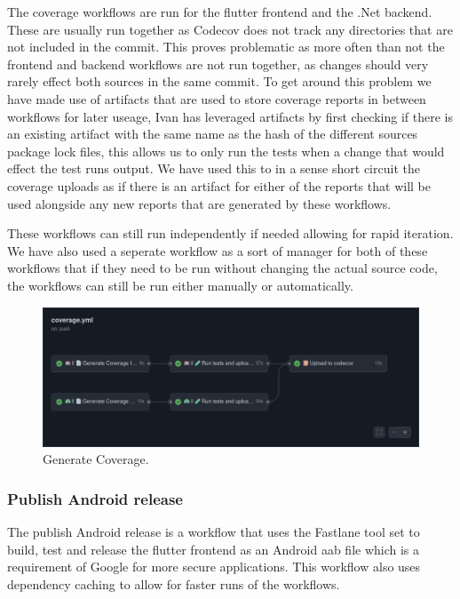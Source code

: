 \documentclass[a4paper]{article}
\begin{document}
The coverage workflows are run for the flutter frontend and the .Net backend. These are usually run 
together as Codecov does not track any directories that are not included in the commit. This proves 
problematic as more often than not the frontend and backend workflows are not run together, as 
changes should very rarely effect both sources in the same commit. To get around this problem 
we have made use of artifacts that are used to store coverage reports in between workflows for later
useage, Ivan has leveraged artifacts by first checking if there is an existing artifact with the 
same name as the hash of the different sources package lock files, this allows us to only run 
the tests when a change that would effect the test runs output. We have used this to in a sense 
short circuit the coverage uploads as if there is an artifact for either of the reports that will be 
used alongside any new reports that are generated by these workflows. 
\newline \newline

These workflows can still run independently if needed allowing for rapid iteration. We have also 
used a seperate workflow as a sort of manager for both of these workflows that if they need to be 
run without changing the actual source code, the workflows can still be run either manually or 
automatically.

\begin{figure}[h]
  \includegraphics[width=\linewidth]{../Assets/coverage_yml.png}
  \caption{Generate Coverage.}
  \label{fig:load graphs}
\end{figure}

\subsubsection{Publish Android release}

The publish Android release is a workflow that uses the Fastlane tool set to build, test and release 
the flutter frontend as an Android aab file which is a requirement of Google for more secure 
applications. This workflow also uses dependency caching to allow for faster runs of the workflows.
\end{document}
